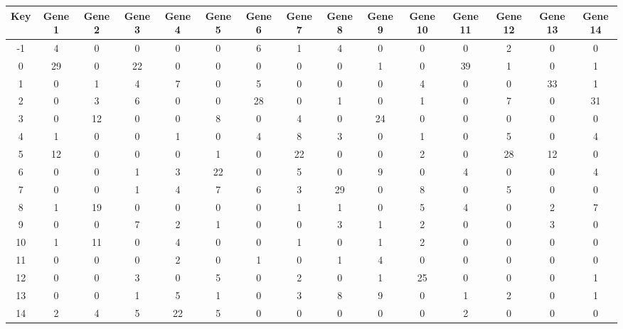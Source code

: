 \begin{tabular}{|c|c|c|c|c|c|c|c|c|c|c|c|c|c|c|}
\hline
Key & Gene 1 & Gene 2 & Gene 3 & Gene 4 & Gene 5 & Gene 6 & Gene 7 & Gene 8 & Gene 9 & Gene 10 & Gene 11 & Gene 12 & Gene 13 & Gene 14 \\
\hline
-1 & 4 & 0 & 0 & 0 & 0 & 6 & 1 & 4 & 0 & 0 & 0 & 2 & 0 & 0 \\
0 & 29 & 0 & 22 & 0 & 0 & 0 & 0 & 0 & 1 & 0 & 39 & 1 & 0 & 1 \\
1 & 0 & 1 & 4 & 7 & 0 & 5 & 0 & 0 & 0 & 4 & 0 & 0 & 33 & 1 \\
2 & 0 & 3 & 6 & 0 & 0 & 28 & 0 & 1 & 0 & 1 & 0 & 7 & 0 & 31 \\
3 & 0 & 12 & 0 & 0 & 8 & 0 & 4 & 0 & 24 & 0 & 0 & 0 & 0 & 0 \\
4 & 1 & 0 & 0 & 1 & 0 & 4 & 8 & 3 & 0 & 1 & 0 & 5 & 0 & 4 \\
5 & 12 & 0 & 0 & 0 & 1 & 0 & 22 & 0 & 0 & 2 & 0 & 28 & 12 & 0 \\
6 & 0 & 0 & 1 & 3 & 22 & 0 & 5 & 0 & 9 & 0 & 4 & 0 & 0 & 4 \\
7 & 0 & 0 & 1 & 4 & 7 & 6 & 3 & 29 & 0 & 8 & 0 & 5 & 0 & 0 \\
8 & 1 & 19 & 0 & 0 & 0 & 0 & 1 & 1 & 0 & 5 & 4 & 0 & 2 & 7 \\
9 & 0 & 0 & 7 & 2 & 1 & 0 & 0 & 3 & 1 & 2 & 0 & 0 & 3 & 0 \\
10 & 1 & 11 & 0 & 4 & 0 & 0 & 1 & 0 & 1 & 2 & 0 & 0 & 0 & 0 \\
11 & 0 & 0 & 0 & 2 & 0 & 1 & 0 & 1 & 4 & 0 & 0 & 0 & 0 & 0 \\
12 & 0 & 0 & 3 & 0 & 5 & 0 & 2 & 0 & 1 & 25 & 0 & 0 & 0 & 1 \\
13 & 0 & 0 & 1 & 5 & 1 & 0 & 3 & 8 & 9 & 0 & 1 & 2 & 0 & 1 \\
14 & 2 & 4 & 5 & 22 & 5 & 0 & 0 & 0 & 0 & 0 & 2 & 0 & 0 & 0 \\
\hline
\end{tabular}